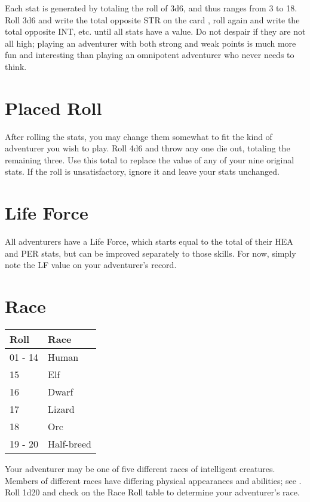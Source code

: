 Each stat is generated by totaling the roll of 3d6, and thus ranges from 3 to 18. Roll 3d6 and write the total opposite STR on the card , roll again and write the total opposite INT, etc. until all stats have a value. Do not despair if they are not all high; playing an adventurer with both strong and weak points is much more fun and interesting than playing an omnipotent adventurer who never needs to think.
\section{Placed Roll}
After rolling the stats, you may change them somewhat to fit the kind of adventurer you wish to play. Roll 4d6 and throw any one die out, totaling the remaining three. Use this total to replace the value of any of your nine original stats. If the roll is unsatisfactory, ignore it and leave your stats unchanged.
\section{Life Force}
All adventurers have a Life Force, which starts equal to the total of their HEA and PER stats, but can be improved separately to those skills. For now, simply note the LF value on your adventurer's record.
\section{Race}

\begin{normbox}
\small
\begin{tabular}{@{}l l}
\textbf{Roll} & \textbf{Race}\\
\midrule
01 - 14 & Human\\
15 & Elf\\
16 & Dwarf \\
17 & Lizard\\
18 & Orc\\
19 - 20 & Half-breed
\end{tabular}
\end{normbox}\smallskip

Your adventurer may be one of five different races of intelligent creatures. Members of different races have differing physical appearances and abilities; see . Roll 1d20 and check on the Race Roll table to determine your adventurer's race.

